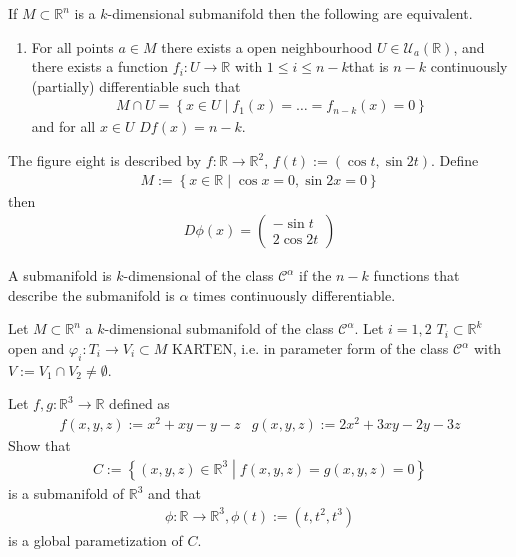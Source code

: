 %
\begin{theorem}
    If \(M \subset \mathbb{R}^n\) is a \(k\)-dimensional submanifold then the following are equivalent.
    \begin{enumerate}
        \item For all points \(a \in M\) there exists a open neighbourhood \(U \in \mathcal{U}_a(\mathbb{R})\), and there exists a function \(f_i: U \rightarrow \mathbb{R}\) with \(1 \leq i \leq n-k\)that is \(n-k\) continuously (partially) differentiable such that
        \begin{align}
            M \cap U = \left\{ x \in U \middle| f_1(x) = \dots = f_{n-k}(x) = 0 \right\}
        \end{align}
        and for all \(x \in U\) \(Df (x) = n-k\).
    \end{enumerate}
\end{theorem}
%
\begin{example}
    The figure eight is described by \(f: \mathbb{R} \rightarrow \mathbb{R}^2\), \(f(t):= (\cos t, \sin 2t)\). Define
    \begin{align}
        M := \left\{ x \in \mathbb{R} \middle | \cos x = 0, \sin 2x = 0 \right\}
    \end{align}
    then
    \begin{align}
        D\phi(x) = \begin{pmatrix}
            -\sin t \\
            2\cos 2t
        \end{pmatrix}
    \end{align}
\end{example}
%
\begin{definition}
    A submanifold is \(k\)-dimensional of the class \(\mathcal{C}^\alpha\) if the \(n-k\) functions that describe the submanifold is \(\alpha\) times continuously differentiable.
\end{definition}
%
\begin{theorem}
    Let \(M \subset \mathbb{R}^n\) a \(k\)-dimensional submanifold of the class \(\mathcal{C}^\alpha\). Let \(i = 1, 2\) \(T_i \subset \mathbb{R}^k\) open and \(\varphi_i: T_i \rightarrow V_i \subset M\) KARTEN, i.e. in parameter form of the class \(\mathcal{C}^\alpha\) with \(V:= V_1 \cap V_2 \neq \emptyset\).
\end{theorem}
%
\begin{question}
    Let \(f, g: \mathbb{R}^3 \rightarrow \mathbb{R}\) defined as
    \begin{align}
        & f(x, y, z) := x^2 + xy - y - z & g(x, y, z) := 2x^2 + 3xy - 2y - 3z &
    \end{align}
    Show that
    \begin{align}
        C := \left\{ (x, y, z) \in \mathbb{R}^3 \middle| f(x, y, z) = g(x, y, z) = 0 \right\}
    \end{align}
    is a submanifold of \(\mathbb{R}^3\) and that
    \begin{align}
        \phi: \mathbb{R} \rightarrow \mathbb{R}^3, \phi(t) := (t, t^2, t^3)
    \end{align}
    is a global parametization of \(C\).
\end{question}
